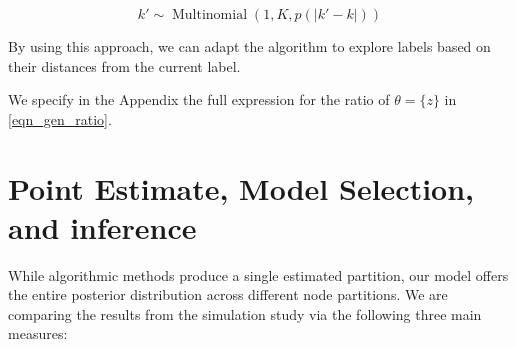 \documentclass[11pt]{amsart}
\begin{document}
\begin{equation}
k' \sim \operatorname{Multinomial}(1, K, p(|k' - k|))
\end{equation}

By using this approach, we can adapt the algorithm to explore labels based on their distances from the current label. 

We specify in the Appendix the full expression for the ratio of $\theta = \{z\}$ in \eqref{eqn_gen_ratio}.




\clearpage

\section{Point Estimate, Model Selection,  and inference}

While algorithmic methods produce a single estimated partition, our model offers the entire posterior distribution across different node partitions. We are comparing the results from the simulation study via the following three main measures:
\end{document}
